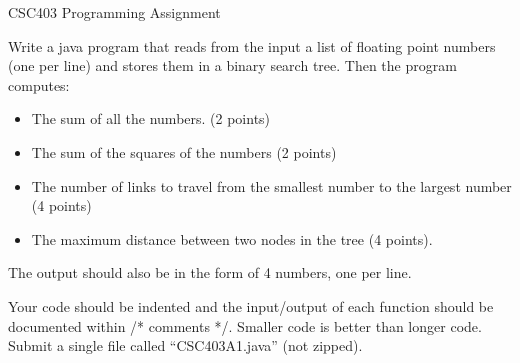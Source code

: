\documentclass[12pt]{article}
\begin{document}
{\LARGE CSC403 Programming Assignment}

Write a java program that reads from the input a list of floating point numbers (one per line) and stores them in a binary search tree. Then the program computes:

\begin{itemize}
\item The sum of all the numbers. (2 points)
\item The sum of the squares of the numbers (2 points)
\item The number of links to travel from the smallest number to the largest number (4 points)
\item The maximum distance between two nodes in the tree (4 points).
\end{itemize}
The output should also be in the form of 4 numbers, one per line.

Your code should be indented and the input/output of each function should be documented within /* comments */. Smaller code is better than longer code. Submit a single file called ``CSC403A1.java'' (not zipped).
\end{document}

